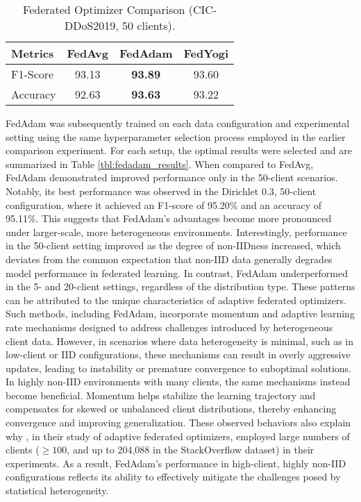 \begin{table}[h]
    \caption{Federated Optimizer Comparison (CIC-DDoS2019, 50 clients).}
    \centering
    \begin{tabular}{l|c|c|c}
      Metrics & FedAvg & FedAdam & FedYogi \\
        \hline\hline
        F1-Score & 93.13 & \textbf{93.89} & 93.60 \\
        Accuracy & 92.63 & \textbf{93.63} & 93.22 \\
    \end{tabular}
    \label{tbl:fed_optim_compare}
\end{table}

FedAdam was subsequently trained on each data configuration and experimental setting using the same hyperparameter selection process employed in the earlier comparison experiment. For each setup, the optimal results were selected and are summarized in Table \ref{tbl:fedadam_results}. When compared to FedAvg, FedAdam demonstrated improved performance only in the 50-client scenarios. Notably, its best performance was observed in the Dirichlet 0.3, 50-client configuration, where it achieved an F1-score of 95.20\% and an accuracy of 95.11\%. This suggests that FedAdam’s advantages become more pronounced under larger-scale, more heterogeneous environments. Interestingly, performance in the 50-client setting improved as the degree of non-IIDness increased, which deviates from the common expectation that non-IID data generally degrades model performance in federated learning. In contrast, FedAdam underperformed in the 5- and 20-client settings, regardless of the distribution type. These patterns can be attributed to the unique characteristics of adaptive federated optimizers. Such methods, including FedAdam, incorporate momentum and adaptive learning rate mechanisms designed to address challenges introduced by heterogeneous client data. However, in scenarios where data heterogeneity is minimal, such as in low-client or IID configurations, these mechanisms can result in overly aggressive updates, leading to instability or premature convergence to suboptimal solutions. In highly non-IID environments with many clients, the same mechanisms instead become beneficial. Momentum helps stabilize the learning trajectory and compensates for skewed or unbalanced client distributions, thereby enhancing convergence and improving generalization. These observed behaviors also explain why \cite{fedoptim}, in their study of adaptive federated optimizers, employed large numbers of clients ($\ge100$, and up to 204,088 in the StackOverflow dataset) in their experiments. As a result, FedAdam's performance in high-client, highly non-IID configurations reflects its ability to effectively mitigate the challenges posed by statistical heterogeneity.

